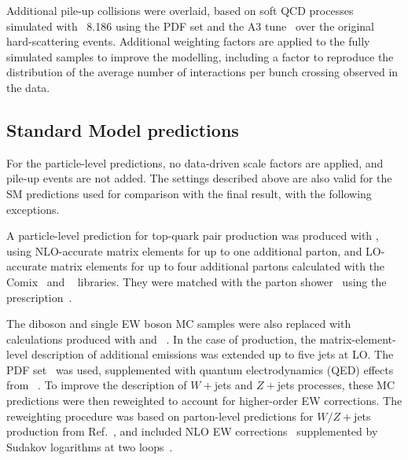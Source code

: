 \documentclass[atlasdraft=false, cernpreprint, UKenglish, texmf, orcidlogo]{atlasdoc}
\begin{document}
Additional pile-up collisions were overlaid, based on soft QCD processes simulated with \PYTHIA~8.186
using the  \NNPDF[2.3lo] PDF set and the A3 tune~\cite{ATL-PHYS-PUB-2016-017}
over the original hard-scattering events. Additional weighting factors are applied to the fully simulated samples to improve the modelling,
including a factor to reproduce the distribution of the average number of interactions per bunch crossing observed in the data.
 
\subsection{Standard Model predictions}
 
For the particle-level predictions, no data-driven scale factors are applied, and pile-up events are not added.
The settings described above are also valid for the SM predictions used for comparison with the final result,
with the following exceptions.
 
A particle-level prediction for top-quark pair production was produced with
\SHERPA[2.2.11], using NLO-accurate
matrix elements for up to one additional parton, and LO-accurate
matrix elements for up to four additional partons calculated with the
Comix~\cite{Gleisberg:2008fv} and \OPENLOOPS[2]~\cite{Buccioni:2019sur,Cascioli:2011va,Buccioni:2017yxi,Denner:2016kdg}
libraries. They were matched with the \SHERPA parton shower~\cite{Schumann:2007mg} using
the \MEPSatNLO prescription~\cite{Hoeche:2011fd,Hoeche:2012yf,Catani:2001cc,Hoeche:2009rj}.
 
The diboson and single EW boson MC samples were also replaced with calculations produced
with \SHERPA[2.2.11] and \OPENLOOPS[2]~\cite{Buccioni:2019sur,Cascioli:2011va,Buccioni:2017yxi,Denner:2016kdg}.
In the case of \vjets production, the matrix-element-level description of additional emissions was extended
up to five jets at LO\@. The \PDFforLHC PDF set~\cite{Butterworth:2015oua} was used,
supplemented with quantum electrodynamics (QED) effects from \LUXQED~\cite{Bertone:2017bme}.
To improve the description of $W+$jets and $Z+$jets processes, these MC predictions were then
reweighted to account for higher-order EW corrections. The reweighting procedure was based on parton-level
predictions for $W/Z+$jets production from Ref.~\cite{Lindert:2017olm},
and included NLO EW corrections~\cite{Denner:2011vu,Denner:2012ts,Kallweit:2015dum,Denner:2009gj}
supplemented by Sudakov logarithms at two loops~\cite{Kuhn:2004em,Kuhn:2007qc,Kuhn:2005az,Kuhn:2007cv}.
 
\end{document}
